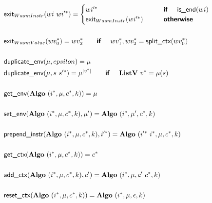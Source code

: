 \begin{align*}
%
\newline \\
  &\exit_{WasmInstr}(wi ~ \seq{wi'}) =
    \begin{cases}
      \seq{wi'} &\quad\quad \premise{if}\quad ~ \helper{is\_end}(wi) \\
      \exit_{WasmInstr}(\seq{wi'}) &\quad\quad \premise{otherwise} \\
    \end{cases}
  \\
%
\newline \\
  &\exit_{WasmValue}(\seq{wv_0}) = \seq{wv_2}
  \quad\quad\premise{if}\quad ~ \seq{wv_1}, \seq{wv_2} = \splitctx(\seq{wv_0}) \\
%
\newline \\
  &\duplicateenv(\mu, epsilon) = \mu \\
  &\duplicateenv(\mu, s ~ \seq{s'}) = \mu^{|\seq v|}
  \quad\quad\premise{if}\quad ~ \listv ~ \seq v = \mu(s) \\
%
\newline \\
  &\getenv(\algo ~ (\seq i, \mu, \seq c, k)) = \mu \\
%
\newline \\
  &\setenv(\algo ~ (\seq i, \mu, \seq c, k), \mu') = \algo ~ (\seq i, \mu', \seq c, k) \\
%
\newline \\
  &\prependinstr(\algo ~ (\seq i, \mu, \seq c, k), \seq{i'}) = \algo ~ (\seq{i'} ~ \seq i, \mu, \seq c, k) \\
%
\newline \\
  &\getctx(\algo ~ (\seq i, \mu, \seq c, k)) = \seq c \\
%
\newline \\
  &\addctx(\algo ~ (\seq i, \mu, \seq c, k), c') = \algo ~ (\seq i, \mu, c' ~ \seq c, k) \\
%
\newline \\
  &\resetctx(\algo ~ (\seq i, \mu, \seq c, k)) = \algo ~ (\seq i, \mu, \epsilon, k) \\
%
\newline \\

\end{align*}
